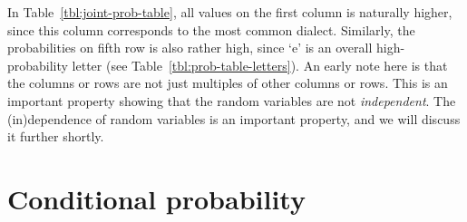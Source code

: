 In Table~\ref{tbl:joint-prob-table},
all values on the first column is naturally higher,
since this column corresponds to the most common dialect.
Similarly,
the probabilities on fifth row is also rather high,
since `e' is an overall high-probability letter
(see Table~\ref{tbl:prob-table-letters}).
An early note here is that
the columns or rows are not just multiples of other columns or rows.
This is an important property showing that
the random variables are not \emph{independent}.
The (in)dependence of random variables is an important property,
and we will discuss it further shortly.

\section{Conditional probability}

